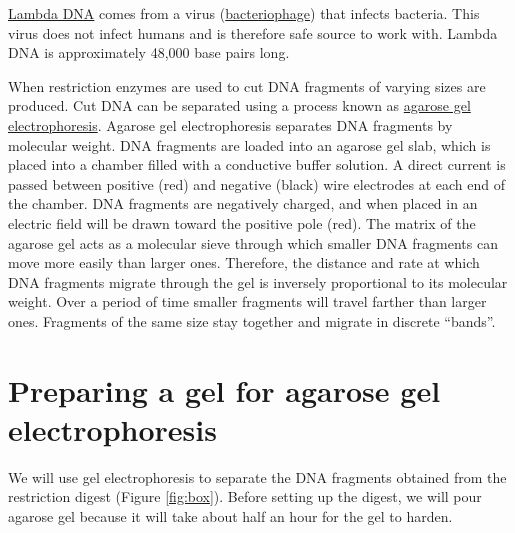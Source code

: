 \href{https://en.wikipedia.org/wiki/Lambda_phage}{Lambda DNA} comes from
a virus
(\href{https://en.wikipedia.org/wiki/Bacteriophage}{bacteriophage}) that
infects bacteria. This virus does not infect humans and is therefore
safe source to work with. Lambda DNA is approximately 48,000 base pairs
long.

When restriction enzymes are used to cut DNA fragments of varying sizes
are produced. Cut DNA can be separated using a process known as
\href{https://en.wikipedia.org/wiki/Agarose_gel_electrophoresis}{agarose
gel electrophoresis}. Agarose gel electrophoresis separates DNA
fragments by molecular weight. DNA fragments are loaded into an agarose
gel slab, which is placed into a chamber filled with a conductive buffer
solution. A direct current is passed between positive (red) and negative
(black) wire electrodes at each end of the chamber. DNA fragments are
negatively charged, and when placed in an electric field will be drawn
toward the positive pole (red). The matrix of the agarose gel acts as a
molecular sieve through which smaller DNA fragments can move more easily
than larger ones. Therefore, the distance and rate at which DNA
fragments migrate through the gel is inversely proportional to its
molecular weight. Over a period of time smaller fragments will travel
farther than larger ones. Fragments of the same size stay together and
migrate in discrete ``bands''.

\section{Preparing a gel for agarose gel
electrophoresis}\label{preparing-a-gel-for-agarose-gel-electrophoresis}

We will use gel electrophoresis to separate the DNA fragments obtained
from the restriction digest (Figure \ref{fig:box}). Before setting up
the digest, we will pour agarose gel because it will take about half an
hour for the gel to harden.

